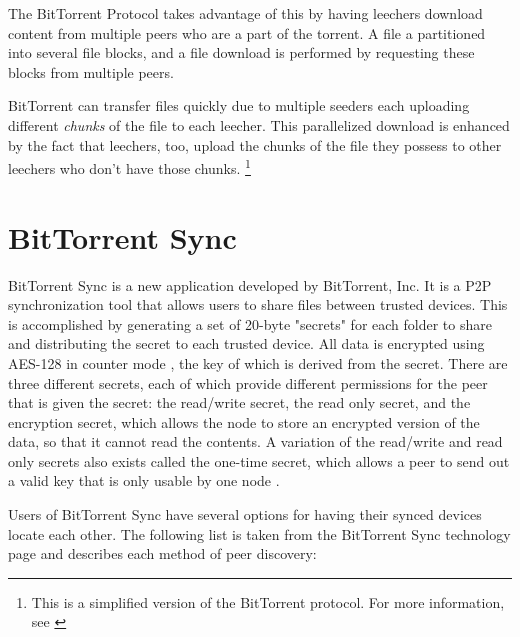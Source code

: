 \documentclass[12pt]{report}
\begin{document}
The BitTorrent Protocol takes advantage of this by having leechers download content from multiple peers who are a part of the torrent. A file a partitioned into several file blocks, and a file download is performed by requesting these blocks from multiple peers. %

BitTorrent can transfer files quickly due to multiple seeders each uploading different \textit{chunks} of the file to each leecher. This parallelized download is enhanced by the fact that leechers, too, upload the chunks of the file they possess to other leechers who don't have those chunks. \footnote {This is a simplified version of the BitTorrent protocol. For more information, see \cite{bittorrentProtocol}}

\section{BitTorrent Sync}
BitTorrent Sync is a new application developed by BitTorrent, Inc. It is a P2P synchronization tool that allows users to share files between trusted devices. This is accomplished by generating a set of 20-byte "secrets" for each folder to share and distributing the secret to each trusted device. All data is encrypted using AES-128 in counter mode \cite{btsynctech}, the key of which is derived from the secret. There are three different secrets, each of which provide different permissions for the peer that is given the secret: the read/write secret, the read only secret, and the encryption secret, which allows the node to store an encrypted version of the data, so that it cannot read the contents. A variation of the read/write and read only secrets also exists called the one-time secret, which allows a peer to send out a valid key that is only usable by one node \cite{btsyncuserguide}.

Users of BitTorrent Sync have several options for having their synced devices locate each other. The following list is taken from the BitTorrent Sync technology page \cite{btsynctech} and describes each method of peer discovery:

\end{document}

